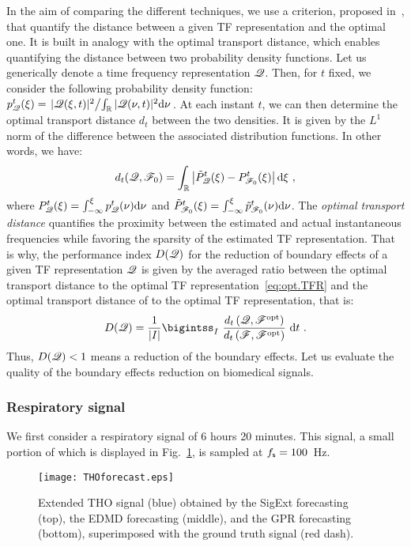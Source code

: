 In the aim of comparing the different techniques, we use a criterion, proposed in~\cite{Daubechies16conceft}, that quantify the distance between a given TF representation and the optimal one. It is built in analogy with the optimal transport distance, which enables quantifying the distance between two probability density functions. Let us generically denote a time frequency representation ${\mathscr Q}$. Then, for $t$ fixed, we consider the following probability density function: $p_{\mathscr Q}^t(\xi) = \left. |{\mathscr Q}(\xi,t)|^2 \middle/ \int_{\mathbb R} |{\mathscr Q}(\nu,t)|^2\mathrm{d}\nu \right.$. At each instant $t$, we can then determine the optimal transport distance $d_{t}$ between the two densities. It is given by the $L^1$ norm of the difference between the associated distribution functions. In other words, we have:
\begin{equation*}
d_{t}(\ccQ,\ccF_0) = \int_\RR\left|\tilde P_{\ccQ}^t(\xi)-  P_{\ccF_0}^t(\xi)\right|\dd\xi\ ,
\end{equation*}
where $P_{{\mathscr Q}}^t(\xi)=\int_{-\infty}^\xi p_{{\mathscr Q}}^t(\nu)\mathrm{d}\nu$ and $\tilde P_{{\mathscr F}_0}^t(\xi)=\int_{-\infty}^\xi\tilde p_{{\mathscr F}_0}^t(\nu)\mathrm{d}\nu$. The \textit{optimal transport distance} quantifies the proximity between the estimated and actual instantaneous frequencies while favoring the sparsity of the estimated TF representation. That is why, the performance index $D({\mathscr Q})$ for the reduction of boundary effects of a given TF representation ${\mathscr Q}$ is given by the averaged ratio between the optimal transport distance to the optimal TF representation~\eqref{eq:opt.TFR} and the optimal transport distance of to the optimal TF representation, that is:
\begin{equation}
D(\ccQ) = \dfrac1{|I|}\bigintss_I\ \frac{d_{t}\left(\ccQ,\ccF^\mathrm{opt}\right)}{d_{t}\left(\ccF,\ccF^\mathrm{opt}\right)}\ \dd t\ .
\label{eq:index.perf}
\end{equation}
Thus, $D({\mathscr Q})<1$ means a reduction of the boundary effects. Let us evaluate the quality of the boundary effects reduction on biomedical signals.


\subsubsection{Respiratory signal}
We first consider a respiratory signal of 6 hours 20 minutes. This signal, a small portion of which is displayed in Fig.~\ref{fig:tho}, is sampled at $f_{\mathsf s}=100$~Hz.

\begin{figure}
\texttt{[image: THOforecast.eps]}
\caption{Extended THO signal (blue) obtained by the {\sf SigExt} forecasting (top), the EDMD forecasting (middle), and the GPR forecasting (bottom), superimposed with the ground truth signal (red dash).}
\label{fig:tho}
\end{figure}

